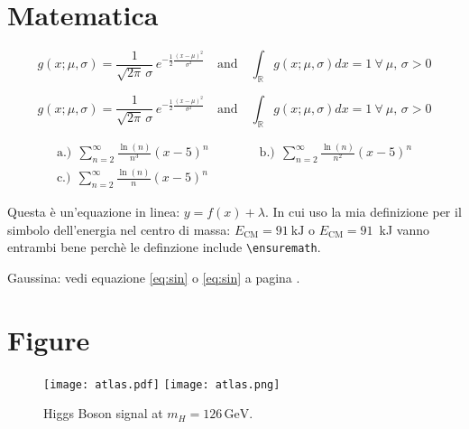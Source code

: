 \documentclass[a4paper, 12pt]{article} %
\newcommand{\ecm}[2][kJ]{\ensuremath{E_{\textrm{CM}} = {#2}}~\textrm{#1}} %
\begin{document}
\section{Matematica}

\begin{equation}
  \label{eq:sin} %
  g(x;\mu,\sigma) = \frac{1}{\sqrt{2\pi}\, \sigma} \, e^{-\frac{1}{2} \frac{(x-\mu)^2}{\sigma^2}} \quad \textrm{and} \quad \int_{\mathbb R} g(x;\mu,\sigma) dx = 1 \ \forall \ \mu, \, \sigma > 0 
\end{equation}

\begin{equation}
  \label{eq:sin2} %
  g(x;\mu,\sigma) = \frac{1}{\sqrt{2\pi}\, \sigma} \, e^{-\frac{1}{2} \frac{(x-\mu)^2}{\sigma^2}} \quad \textrm{and} \quad \int_{\mathbb R} g(x;\mu,\sigma) dx = 1 \ \forall \ \mu, \, \sigma > 0 \tag{\$}
\end{equation} 


\[
\begin{gathered} %
\mbox{a.)}\ \ \sum_{n=2}^{\infty} \frac{\ln(n)}{n^3} (x-5)^n \qquad \qquad 
\mbox{b.)}\ \ \sum_{n=2}^{\infty} \frac{\ln(n)}{n^2} (x-5)^n \\
\mbox{c.)}\ \ \sum_{n=2}^{\infty} \frac{\ln(n)}{n} (x-5)^n
\end{gathered}
\]


Questa è un'equazione in linea: $y = f(x)+\lambda$. In cui uso la mia definizione per il simbolo dell'energia nel centro di massa: $\ecm{91}$ o \ecm{91} vanno entrambi bene perchè le definzione include \verb!\ensuremath!. %

Gaussina: vedi equazione \ref{eq:sin}  o \eqref{eq:sin} a pagina \pageref{eq:sin}.

\section{Figure}


\begin{figure}[h!]
  \centering
  \texttt{[image: atlas.pdf]}
  \texttt{[image: atlas.png]} %
  \caption{Higgs Boson signal at $m_H = 126\, \textrm{GeV}$. \label{fig:atlas}}
\end{figure}
\end{document}
